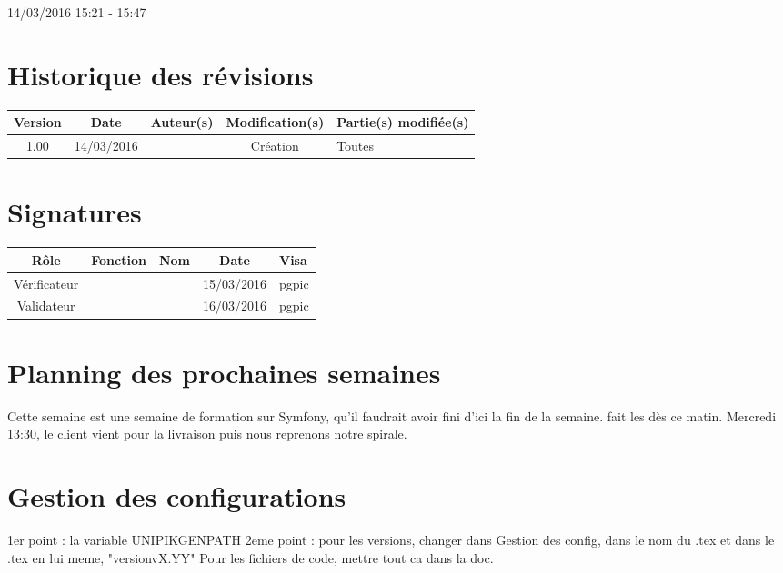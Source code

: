 \documentclass [a4paper] {article}
\begin{document}
14/03/2016			 				%
\hfill   
\hfill 	 15:21 - 15:47 				%



\section*{Historique des révisions}
\begin{center}
			\begin{tabular}{| c | c | c | c | p{4cm} |}
				\hline
				\rowcolor{Gray}
				Version & Date & Auteur(s) & Modification(s) & Partie(s) modifiée(s)		 \\
				\hline
				1.00 & 14/03/2016 & \Pierre & Création & Toutes \\
		\hline		
			\end{tabular}
		\end{center}

\section*{Signatures}

		\begin{center}
			\begin{tabular}{| c | c | c | c | p{4cm} |}
				\hline
				\rowcolor{Gray}
				Rôle & Fonction & Nom & Date & Visa		 \\
				\hline
				Vérificateur & \RQA & \Kafui & 15/03/2016 & pgpic \\[30pt]
				\hline
				Validateur & \CP & \Sergi & 16/03/2016 & pgpic \\[30pt]	
				\hline
			\end{tabular}
		\end{center}
		
\newpage		



\section{Planning des prochaines semaines}
Cette semaine est une semaine de formation sur Symfony, qu'il faudrait avoir fini d'ici la fin de la semaine. \Florian{} fait les \FF{} dès ce matin. Mercredi 13:30, le client vient pour la livraison puis nous reprenons notre spirale.


\section{Gestion des configurations}
1er point : la variable UNIPIKGENPATH
2eme point : pour les versions, changer dans Gestion des config, dans le nom du .tex et dans le .tex en lui meme, "version{vX.YY}"
Pour les fichiers de code, mettre tout ca dans la doc.
\end{document}
